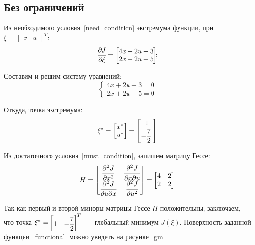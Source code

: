 \subsection{Без ограничений}\label{global_min}
Из необходимого условия~\eqref{need_condition} экстремума функции, при $\xi = \begin{bmatrix}x & u\end{bmatrix}^T\!\!\!$:
\begin{equation}\label{grad}
		\cfrac{\partial{J}}{\partial{\xi}} = 
		\begin{bmatrix}
			4 x + 2 u + 3 \\
			2 x + 2 u + 5
		\end{bmatrix}\!\!;
\end{equation}

Составим и решим систему уравнений:
\begin{equation}
	\begin{cases}
		4 x + 2 u + 3 = 0 \\
		2 x + 2 u + 5 = 0
	\end{cases}
\end{equation}

Откуда, точка экстремума:
\begin{equation}\label{global_min_point}
	\xi^* = 
	\begin{bmatrix}
		x^*\\u^*
	\end{bmatrix}
	=
	\begin{bmatrix}
		1 \\
		-\cfrac{7}{2}~
	\end{bmatrix}
\end{equation}

Из достаточного условия~\eqref{must_condition}, запишем матрицу Гессе:
\begin{equation}\label{gesse}
	H = 
	\begin{bmatrix}
		\cfrac{\partial^2 J}{\partial x^2} & \cfrac{\partial^2 J}{\partial x \partial u} \\
		\cfrac{\partial^2 J}{\partial u \partial x} & \cfrac{\partial^2 J}{\partial u^2}
	\end{bmatrix}
	= 
	\begin{bmatrix}
		4 & 2 \\
		2 & 2
	\end{bmatrix}
\end{equation}

Так как первый и второй миноры матрицы Гессе $H$ положительны, заключаем, что точка $\xi^*	= \begin{bmatrix} 1 & -\cfrac{7}{2} \end{bmatrix}^T$~--- глобальный минимум $J(\xi)$. Поверхность заданной функции~\eqref{functional} можно увидеть на рисунке~\ref{gm}

